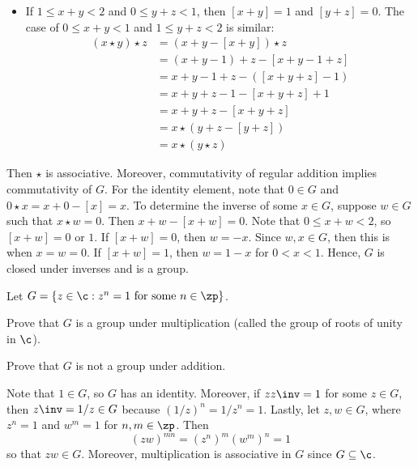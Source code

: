 \begin{problems}
\begin{sol}
\begin{itemize}
\begin{align*}
                & = x \star (y \star z)
            \end{align*}
            \item If $1 \leq x + y  < 2$ and $0 \leq y + z < 1$, then $[x + y] = 1$ and $[y + z] = 0$. The case of $0 \leq x + y < 1$ and $1 \leq y + z < 2$ is similar:
            \begin{align*}
                (x \star y) \star z & = (x + y - [x + y]) \star z \\
                & = (x + y - 1) + z - [x + y - 1 + z] \\
                & = x + y - 1 + z - ([x + y + z] - 1) \\
                & = x + y + z - 1 - [x + y + z] + 1 \\
                & = x + y + z - [x + y + z] \\
                & = x \star (y + z - [y + z]) \\
                & = x \star (y \star z)
            \end{align*}
        \end{itemize}
        Then $\star$ is associative. Moreover, commutativity of regular addition implies commutativity of $G$. For the identity element, note that $0 \in G$ and $0 \star x = x + 0 - [x] = x$. To determine the inverse of some $x \in G$, suppose $w \in G$ such that $x \star w = 0$. Then $x + w - [x + w] = 0$. Note that $0 \leq x + w < 2$, so $[x + w] = 0$ or $1$. If $[x + w] = 0$, then $w = -x$. Since $w, x \in G$, then this is when $x = w = 0$. If $[x + w] = 1$, then $w = 1 - x$ for $0 < x < 1$. Hence, $G$ is closed under inverses and is a group.
    \end{sol}
    \item Let $G = \{z \in \c :  z^n = 1 \text{ for some } n \in \zp \}$.
    \begin{problems}
        \item Prove that $G$ is a group under multiplication (called the group of roots of unity in $\c$).
        \item Prove that $G$ is not a group under addition.
    \end{problems}
    \begin{solalph}
        \item Note that $1 \in G$, so $G$ has an identity. Moreover, if $zz\inv = 1$ for some $z \in G$, then $z \inv = 1/z \in G$ because $(1/z)^n = 1/z^n = 1$. Lastly, let $z, w \in G$, where $z^n = 1$ and $w^m = 1$ for $n, m \in \zp$. Then
        $$(zw)^{mn} = (z^n)^m (w^m)^n = 1$$
        so that $zw \in G$. Moreover, multiplication is associative in $G$ since $G \subseteq \c$.

\end{solalph}
\end{problems}
